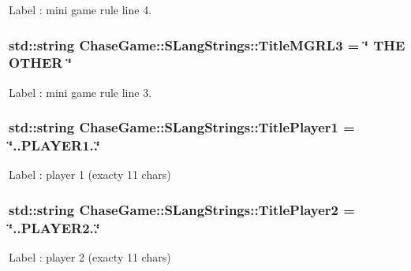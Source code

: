Label \-: mini game rule line 4. 

\hypertarget{struct_chase_game_1_1_s_lang_strings_af09837dc3975dc46a32092fa63824a09}{
\subsubsection[{Title\-M\-G\-R\-L3}]{\setlength{\rightskip}{0pt plus 5cm}std\-::string Chase\-Game\-::\-S\-Lang\-Strings\-::\-Title\-M\-G\-R\-L3 = \char`\"{} T\-H\-E O\-T\-H\-E\-R \char`\"{}}}\label{struct_chase_game_1_1_s_lang_strings_af09837dc3975dc46a32092fa63824a09}


Label \-: mini game rule line 3. 

\hypertarget{struct_chase_game_1_1_s_lang_strings_a95282707ee9c1c83bcb44ef4a167ba67}{
\subsubsection[{Title\-Player1}]{\setlength{\rightskip}{0pt plus 5cm}std\-::string Chase\-Game\-::\-S\-Lang\-Strings\-::\-Title\-Player1 = \char`\"{}..P\-L\-A\-Y\-E\-R1..\char`\"{}}}\label{struct_chase_game_1_1_s_lang_strings_a95282707ee9c1c83bcb44ef4a167ba67}


Label \-: player 1 (exacty 11 chars) 

\hypertarget{struct_chase_game_1_1_s_lang_strings_a462589a11d9d088d7efdf6572c810c08}{
\subsubsection[{Title\-Player2}]{\setlength{\rightskip}{0pt plus 5cm}std\-::string Chase\-Game\-::\-S\-Lang\-Strings\-::\-Title\-Player2 = \char`\"{}..P\-L\-A\-Y\-E\-R2..\char`\"{}}}\label{struct_chase_game_1_1_s_lang_strings_a462589a11d9d088d7efdf6572c810c08}


Label \-: player 2 (exacty 11 chars) 

